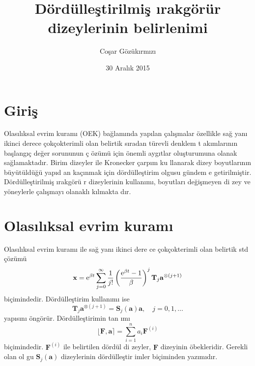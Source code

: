 \documentclass[a4paper,10pt]{article}
\title{D\"ord\"ulle\c{s}tirilmi\c{s} \i rakg\"or\"ur dizeylerinin 
belirlenimi}
\author{Co\c{s}ar G\"oz\"uk\i rm\i z{\i}}
\date{30 Aral\i k 2015}
\begin{document}
\maketitle

\section{Giri\c{s}}

Olas\i l\i ksal evrim kuram{\i} (OEK) ba\u{g}lam\i nda yap\i lan %
\c{c}al\i \c{s}malar \"ozellikle sa\u{g} yan{\i} ikinci de\-rece %
\c{c}ok\c{c}okterimli olan belirtik s\i radan t\"urevli denklem t%
ak\i mlar\i n\i n ba\c{s}lang\i \c{c} de\u{g}er so\-rununun \c{c}%
\"oz\"um\"u i\c{c}in \"onemli ayg\i tlar olu\c{s}turumuna olanak %
sa\u{g}lamaktad\i r. Birim dizeyler ile Kronecker \c{c}arp\i m ku%
llanarak dizey boyutlar\i n\i n b\"uy\"ut\"uld\"u\u{g}\"u yap\i d%
an ka\c{c}\i nmak i\c{c}in d\"ord\"ulle\c{s}tirim olgusu g\"undem%
e getirilmi\c{s}tir. D\"ord\"ulle\c{s}tirilmi\c{s} \i rakg\"or\"u%
r dizeylerinin kullan\i m{\i}, boyutlar{\i} de\u{g}i\c{s}meyen di%
zey ve y\"oneylerle \c{c}al\i \c{s}may{\i} olanakl{\i} k\i lmakta%
d\i r.

\section{Olas\i l\i ksal evrim kuram{\i}}

Olas\i l\i ksal evrim kuram{\i} ile sa\u{g} yan{\i} ikinci de\-re%
ce \c{c}ok\c{c}okterimli olan belirtik std \c{c}\"oz\"um\"u %
\begin{equation}
\mathbf{x} = {\rm e}^{\beta t}
\sum\limits_{j=0}^{\infty}\frac{1}{j!}%
\left(\frac{{\rm e}^{\beta t}-1}{\beta}\right)^{j}%
\mathbf{T}_{j}
\mathbf{a}^{\otimes (j+1)}
\label{eq:XNCbh}
\end{equation}
bi\c{c}imindedir. D\"ord\"ulle\c{s}tirim kullan{\i}m{\i} ise %
\begin{equation}
 \mathbf{T}_{j} \mathbf{a}^{\otimes (j+1)} = 
 \mathbf{S}_{j}(\mathbf{a})
 \mathbf{a}, \quad j=0,1,\ldots
\label{eq:AN8En}
\end{equation}
yap\i s\i n{\i} \"ong\"or\"ur. D\"or\-d\"ul\-le\c{s}ti\-rimin tan%
\i m{\i} %
\begin{equation}
 \lfloor \mathbf{F} , \mathbf{a} \rceil = 
 \sum_{i=1}^{n} a_{i} \mathbf{F}^{(i)}
\label{eq:vWTnF}
\end{equation}
bi\c{c}imindedir. $\mathbf{F}^{(i)}$ ile belirtilen d\"ord\"ul di%
zeyler, $\mathbf{F}$ dizeyinin \"obekleridir. Ge\-rek\-li olan ol%
gu $\mathbf{S}_{j}(\mathbf{a})$ dizeylerinin d\"ord\"ulle\c{s}tir%
imler bi\c{c}iminden yaz\i m\i d\i r. %
\end{document}
